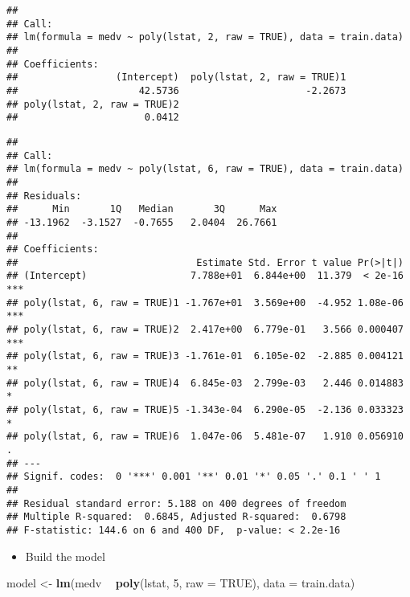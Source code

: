\documentclass[]{article}
\newenvironment{Shaded}{\begin{snugshade}}{\end{snugshade}}
\newcommand{\DataTypeTok}[1]{\textcolor[rgb]{0.13,0.29,0.53}{#1}}
\newcommand{\DecValTok}[1]{\textcolor[rgb]{0.00,0.00,0.81}{#1}}
\newcommand{\KeywordTok}[1]{\textcolor[rgb]{0.13,0.29,0.53}{\textbf{#1}}}
\newcommand{\NormalTok}[1]{#1}
\newcommand{\OperatorTok}[1]{\textcolor[rgb]{0.81,0.36,0.00}{\textbf{#1}}}
\newcommand{\OtherTok}[1]{\textcolor[rgb]{0.56,0.35,0.01}{#1}}
\newcommand{\StringTok}[1]{\textcolor[rgb]{0.31,0.60,0.02}{#1}}
\providecommand{\tightlist}{%
  \setlength{\itemsep}{0pt}\setlength{\parskip}{0pt}}
\begin{document}
\begin{verbatim}
## 
## Call:
## lm(formula = medv ~ poly(lstat, 2, raw = TRUE), data = train.data)
## 
## Coefficients:
##                 (Intercept)  poly(lstat, 2, raw = TRUE)1  
##                     42.5736                      -2.2673  
## poly(lstat, 2, raw = TRUE)2  
##                      0.0412
\end{verbatim}

\begin{Shaded}
\end{Shaded}

\begin{verbatim}
## 
## Call:
## lm(formula = medv ~ poly(lstat, 6, raw = TRUE), data = train.data)
## 
## Residuals:
##      Min       1Q   Median       3Q      Max 
## -13.1962  -3.1527  -0.7655   2.0404  26.7661 
## 
## Coefficients:
##                               Estimate Std. Error t value Pr(>|t|)    
## (Intercept)                  7.788e+01  6.844e+00  11.379  < 2e-16 ***
## poly(lstat, 6, raw = TRUE)1 -1.767e+01  3.569e+00  -4.952 1.08e-06 ***
## poly(lstat, 6, raw = TRUE)2  2.417e+00  6.779e-01   3.566 0.000407 ***
## poly(lstat, 6, raw = TRUE)3 -1.761e-01  6.105e-02  -2.885 0.004121 ** 
## poly(lstat, 6, raw = TRUE)4  6.845e-03  2.799e-03   2.446 0.014883 *  
## poly(lstat, 6, raw = TRUE)5 -1.343e-04  6.290e-05  -2.136 0.033323 *  
## poly(lstat, 6, raw = TRUE)6  1.047e-06  5.481e-07   1.910 0.056910 .  
## ---
## Signif. codes:  0 '***' 0.001 '**' 0.01 '*' 0.05 '.' 0.1 ' ' 1
## 
## Residual standard error: 5.188 on 400 degrees of freedom
## Multiple R-squared:  0.6845, Adjusted R-squared:  0.6798 
## F-statistic: 144.6 on 6 and 400 DF,  p-value: < 2.2e-16
\end{verbatim}

\begin{itemize}
\tightlist
\item
  Build the model
\end{itemize}

\begin{Shaded}
\begin{Highlighting}[]
\NormalTok{model <-}\StringTok{ }\KeywordTok{lm}\NormalTok{(medv }\OperatorTok{~}\StringTok{ }\KeywordTok{poly}\NormalTok{(lstat, }\DecValTok{5}\NormalTok{, }\DataTypeTok{raw =} \OtherTok{TRUE}\NormalTok{), }\DataTypeTok{data =}\NormalTok{ train.data)}
\end{Highlighting}
\end{Shaded}
\end{document}
